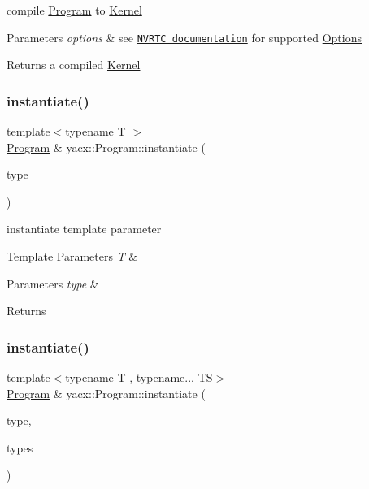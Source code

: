 compile \hyperlink{classyacx_1_1_program}{Program} to \hyperlink{classyacx_1_1_kernel}{Kernel} 
\begin{DoxyParams}{Parameters}
{\em options} & see \href{https://docs.nvidia.com/cuda/nvrtc/index.html#group__options}{\tt N\+V\+R\+TC documentation} for supported \hyperlink{classyacx_1_1_options}{Options} \\
\hline
\end{DoxyParams}
\begin{DoxyReturn}{Returns}
a compiled \hyperlink{classyacx_1_1_kernel}{Kernel} 
\end{DoxyReturn}
\mbox{\label{classyacx_1_1_program_a220a1c9deb8d04152e3118530dd79d1f}} 
\subsubsection{\texorpdfstring{instantiate()}{instantiate()}\hspace{0.1cm}{\footnotesize\ttfamily [1/2]}}
{\footnotesize\ttfamily template$<$typename T $>$ \\
\hyperlink{classyacx_1_1_program}{Program} \& yacx\+::\+Program\+::instantiate (\begin{DoxyParamCaption}\item[{T}]{type }\end{DoxyParamCaption})}

instantiate template parameter 
\begin{DoxyTemplParams}{Template Parameters}
{\em T} & \\
\hline
\end{DoxyTemplParams}

\begin{DoxyParams}{Parameters}
{\em type} & \\
\hline
\end{DoxyParams}
\begin{DoxyReturn}{Returns}

\end{DoxyReturn}
\mbox{\label{classyacx_1_1_program_ad1800bf0daf8b64c357606a26b6e254d}} 
\subsubsection{\texorpdfstring{instantiate()}{instantiate()}\hspace{0.1cm}{\footnotesize\ttfamily [2/2]}}
{\footnotesize\ttfamily template$<$typename T , typename... TS$>$ \\
\hyperlink{classyacx_1_1_program}{Program} \& yacx\+::\+Program\+::instantiate (\begin{DoxyParamCaption}\item[{T}]{type,  }\item[{T\+S...}]{types }\end{DoxyParamCaption})}


